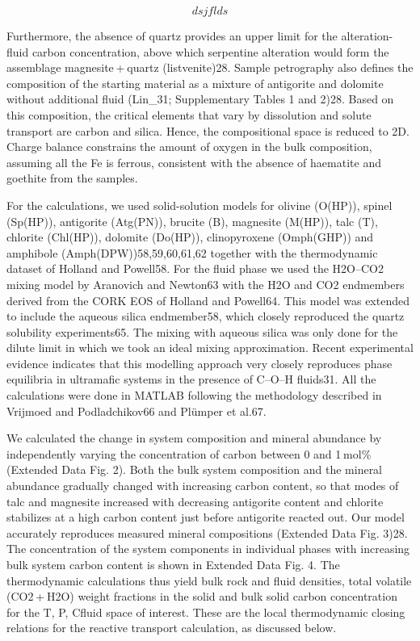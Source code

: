 \begin{equation}
	dsjflds
	\label{eq:eq1}
\end{equation}

Furthermore, the absence of quartz provides an upper limit for the alteration-fluid carbon concentration, above which serpentine alteration would form the assemblage magnesite + quartz (listvenite)28. Sample petrography also defines the composition of the starting material as a mixture of antigorite and dolomite without additional fluid (Lin\_31; Supplementary Tables 1 and 2)28. Based on this composition, the critical elements that vary by dissolution and solute transport are carbon and silica. Hence, the compositional space is reduced to 2D. Charge balance constrains the amount of oxygen in the bulk composition, assuming all the Fe is ferrous, consistent with the absence of haematite and goethite from the samples.

For the calculations, we used solid-solution models for olivine (O(HP)), spinel (Sp(HP)), antigorite (Atg(PN)), brucite (B), magnesite (M(HP)), talc (T), chlorite (Chl(HP)), dolomite (Do(HP)), clinopyroxene (Omph(GHP)) and amphibole (Amph(DPW))58,59,60,61,62 together with the thermodynamic dataset of Holland and Powell58. For the fluid phase we used the H2O–CO2 mixing model by Aranovich and Newton63 with the H2O and CO2 endmembers derived from the CORK EOS of Holland and Powell64. This model was extended to include the aqueous silica endmember58, which closely reproduced the quartz solubility experiments65. The mixing with aqueous silica was only done for the dilute limit in which we took an ideal mixing approximation. Recent experimental evidence indicates that this modelling approach very closely reproduces phase equilibria in ultramafic systems in the presence of C–O–H fluids31. All the calculations were done in MATLAB following the methodology described in Vrijmoed and Podladchikov66 and Plümper et al.67.

We calculated the change in system composition and mineral abundance by independently varying the concentration of carbon between 0 and 1 mol\% (Extended Data Fig. 2). Both the bulk system composition and the mineral abundance gradually changed with increasing carbon content, so that modes of talc and magnesite increased with decreasing antigorite content and chlorite stabilizes at a high carbon content just before antigorite reacted out. Our model accurately reproduces measured mineral compositions (Extended Data Fig. 3)28. The concentration of the system components in individual phases with increasing bulk system carbon content is shown in Extended Data Fig. 4. The thermodynamic calculations thus yield bulk rock and fluid densities, total volatile (CO2 + H2O) weight fractions in the solid and bulk solid carbon concentration for the T, P, Cfluid space of interest. These are the local thermodynamic closing relations for the reactive transport calculation, as discussed below.

